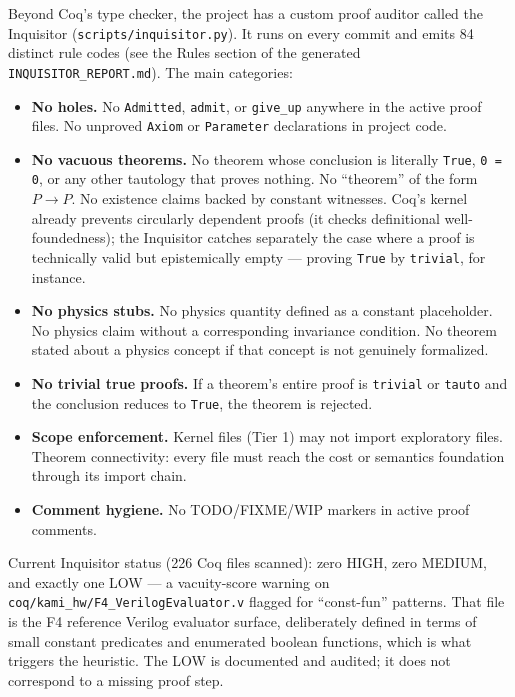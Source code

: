 \documentclass[11pt,a4paper]{article}
\theoremstyle{plain}
\theoremstyle{definition}
\theoremstyle{remark}
\begin{document}
Beyond Coq's type checker, the project has a custom proof auditor called the Inquisitor (\texttt{scripts/inquisitor.py}). It runs on every commit and emits 84 distinct rule codes (see the Rules section of the generated \texttt{INQUISITOR\_REPORT.md}). The main categories:
\begin{itemize}
\item \textbf{No holes.} No \texttt{Admitted}, \texttt{admit}, or \texttt{give\_up} anywhere in the active proof files. No unproved \texttt{Axiom} or \texttt{Parameter} declarations in project code.
\item \textbf{No vacuous theorems.} No theorem whose conclusion is literally \texttt{True}, \texttt{0 = 0}, or any other tautology that proves nothing. No ``theorem'' of the form $P \to P$. No existence claims backed by constant witnesses. Coq's kernel already prevents circularly dependent proofs (it checks definitional well-foundedness); the Inquisitor catches separately the case where a proof is technically valid but epistemically empty --- proving \texttt{True} by \texttt{trivial}, for instance.
\item \textbf{No physics stubs.} No physics quantity defined as a constant placeholder. No physics claim without a corresponding invariance condition. No theorem stated about a physics concept if that concept is not genuinely formalized.
\item \textbf{No trivial true proofs.} If a theorem's entire proof is \texttt{trivial} or \texttt{tauto} and the conclusion reduces to \texttt{True}, the theorem is rejected.
\item \textbf{Scope enforcement.} Kernel files (Tier 1) may not import exploratory files. Theorem connectivity: every file must reach the cost or semantics foundation through its import chain.
\item \textbf{Comment hygiene.} No TODO/FIXME/WIP markers in active proof comments.
\end{itemize}

Current Inquisitor status (226 Coq files scanned): zero HIGH, zero MEDIUM, and exactly one LOW --- a vacuity-score warning on \texttt{coq/kami\_hw/F4\_VerilogEvaluator.v} flagged for ``const-fun'' patterns. That file is the F4 reference Verilog evaluator surface, deliberately defined in terms of small constant predicates and enumerated boolean functions, which is what triggers the heuristic. The LOW is documented and audited; it does not correspond to a missing proof step.

\end{document}

